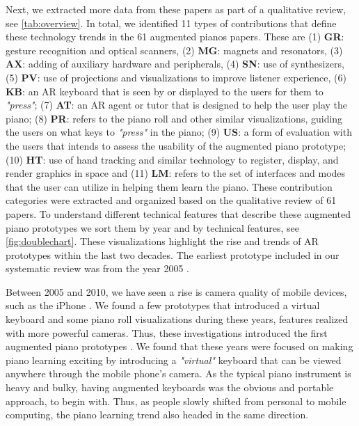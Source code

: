 \documentclass[sigconf, screen, review]{acmart}
\begin{document}
Next, we extracted more data from these papers as part of a qualitative review, see \autoref{tab:overview}. In total, we identified 11 types of contributions that define these technology trends in the 61 augmented pianos papers. These are (1) \textbf{GR}: gesture recognition and optical scanners, (2) \textbf{MG}: magnets and resonators, (3) \textbf{AX}: adding of auxiliary hardware and peripherals, (4) \textbf{SN}: use of synthesizers, (5) \textbf{PV}: use of projections and visualizations to improve listener experience, (6) \textbf{KB}: an AR keyboard that is seen by or displayed to the users for them to \textit{"press"}; (7) \textbf{AT}: an AR agent or tutor that is designed to help the user play the piano; (8) \textbf{PR}: refers to the piano roll and other similar visualizations, guiding the users on what keys to  \textit{"press"} in the piano; (9) \textbf{US}: a form of evaluation with the users that intends to assess the usability of the augmented piano prototype; (10) \textbf{HT}: use of hand tracking and similar technology to register, display, and render graphics in space and (11) \textbf{LM}: refers to the set of interfaces and modes that the user can utilize in helping them learn the piano. These contribution categories were extracted and organized based on the qualitative review of 61 papers. To understand different technical features that describe these augmented piano prototypes we sort them by year and by technical features, see \autoref{fig:doublechart}. These visualizations highlight the rise and trends of AR prototypes within the last two decades. The earliest prototype included in our systematic review was from the year 2005 \cite{barakonyi2005augmented}.

Between 2005 and 2010, we have seen a rise is camera quality of mobile devices, such as the iPhone \cite{querashi2012apple}. We found a few prototypes that introduced a virtual keyboard and some piano roll visualizations during these years, features realized with more powerful cameras. Thus, these investigations introduced the first augmented piano prototypes \cite{barakonyi2005augmented, schmalstieg2007experiences, correa2009computer, mcpherson2010augmenting, mcpherson2010toward, zhang2010affordable}. We found that these years were focused on making piano learning exciting by introducing a \textit{"virtual"} keyboard that can be viewed anywhere through the mobile phone's camera. As the typical piano instrument is heavy and bulky, having augmented keyboards was the obvious and portable approach, to begin with. Thus, as people slowly shifted from personal to mobile computing, the piano learning trend also headed in the same direction. 
\end{document}
